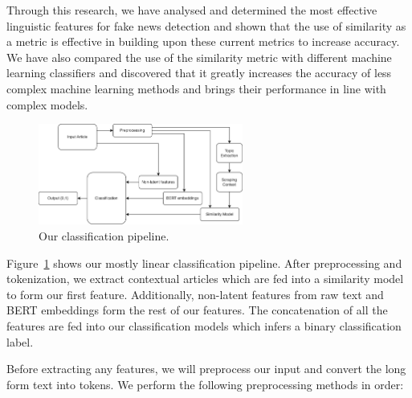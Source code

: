 \documentclass{article}
\begin{document}
Through this research, we have analysed and determined the most effective linguistic features for fake news detection and shown that the use of similarity as a metric is effective in building upon these current metrics to increase accuracy. We have also compared the use of the similarity metric with different machine learning classifiers and discovered that it greatly increases the accuracy of less complex machine learning methods and brings their performance in line with complex models.




\begin{minipage}{\textwidth}
  \begin{figure}
    \vspace*{-20pt}
    \centering
    \includegraphics[width=0.6\textwidth]{img/pipeline.png}
    \caption{Our classification pipeline.}
    \label{pipeline}
  \end{figure}

  Figure~\ref{pipeline} shows our mostly linear classification pipeline. After preprocessing and tokenization, we extract contextual articles which are fed into a similarity model to form our first feature. Additionally, non-latent features from raw text and BERT embeddings form the rest of our features. The concatenation of all the features are fed into our classification models which infers a binary classification label.
\end{minipage}

\label{section:preprocessing}

Before extracting any features, we will preprocess our input and convert the long form text into tokens. We perform the following preprocessing methods in order:
\end{document}
